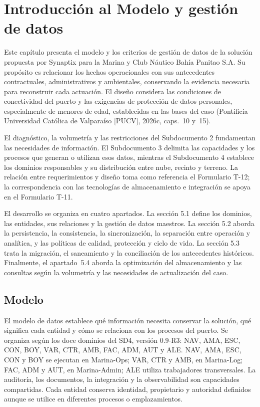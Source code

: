 \setcounter{chapter}{4}
\chapter{Introducción al Modelo y gestión de datos}
Este capítulo presenta el modelo y los criterios de gestión de datos de la solución propuesta por Synaptix para la Marina y Club Náutico Bahía Panitao S.A. Su propósito es relacionar los hechos operacionales con sus antecedentes contractuales, administrativos y ambientales, conservando la evidencia necesaria para reconstruir cada actuación. El diseño considera las condiciones de conectividad del puerto y las exigencias de protección de datos personales, especialmente de menores de edad, establecidas en las bases del caso (Pontificia Universidad Católica de Valparaíso [PUCV], 2026c, caps.~10 y~15).

El diagnóstico, la volumetría y las restricciones del Subdocumento 2 fundamentan las necesidades de información. El Subdocumento 3 delimita las capacidades y los procesos que generan o utilizan esos datos, mientras el Subdocumento 4 establece los dominios responsables y su distribución entre nube, recinto y terreno. La relación entre requerimientos y diseño toma como referencia el Formulario T-12; la correspondencia con las tecnologías de almacenamiento e integración se apoya en el Formulario T-11.

El desarrollo se organiza en cuatro apartados. La sección 5.1 define los dominios, las entidades, sus relaciones y la gestión de datos maestros. La sección 5.2 aborda la persistencia, la consistencia, la sincronización, la separación entre operación y analítica, y las políticas de calidad, protección y ciclo de vida. La sección 5.3 trata la migración, el saneamiento y la conciliación de los antecedentes históricos. Finalmente, el apartado~5.4 aborda la optimización del almacenamiento y las consultas según la volumetría y las necesidades de actualización del caso.

\newpage
\section{Modelo} %
El modelo de datos establece qué información necesita conservar la solución, qué significa cada entidad y cómo se relaciona con los procesos del puerto. Se organiza según los doce dominios del SD4, versión 0.9-R3: NAV, AMA, ESC, CON, BOY, VAR, CTR, AMB, FAC, ADM, AUT y ALE. NAV, AMA, ESC, CON y BOY se ejecutan en Marina-Ops; VAR, CTR y AMB, en Marina-Log; FAC, ADM y AUT, en Marina-Admin; ALE utiliza trabajadores transversales. La auditoría, los documentos, la integración y la observabilidad son capacidades compartidas. Cada entidad conserva identidad, propietario y autoridad definidos aunque se utilice en diferentes procesos o emplazamientos.

